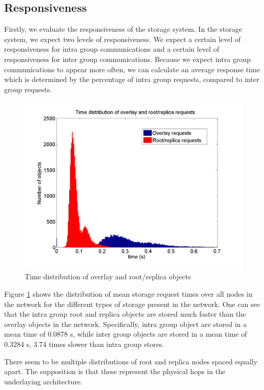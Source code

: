 \documentclass[10pt,a4paper,conference]{IEEEtran}
\begin{document}
\subsection{Responsiveness}

Firstly, we evaluate the responsiveness of the storage system. In the storage system, we expect two levels of responsiveness. We expect a certain
level of responsiveness for intra group communications and a certain level of responsiveness for inter group communications. Because we expect intra
group communications to appear more often, we can calculate an average response time which is determined by the percentage of intra group requests,
compared to inter group requests.

\begin{figure}[htbp]
 \centering
 \includegraphics[clip=true, viewport=1.5cm 1.3cm 25.5cm 19.7cm, width=\columnwidth]{request_time_distribution}
 \caption{Time distribution of overlay and root/replica objects}
 \label{fig_pithos_response}
\end{figure}
%
Figure \ref{fig_pithos_response} shows the distribution of mean storage request times over all nodes in the network for the different types of
storage present in the network. One can see that the intra group root and replica objects are stored much faster than the overlay objects in the
network. Specifically, intra group object are stored in a mean time of 0.0878 s, while inter group objects are stored in a mean time of 0.3284 s,
3.74 times slower than intra group stores.

There seem to be multiple distributions of root and replica nodes spaced equally apart. The supposition is that these represent the physical hops in
the underlaying architecture.
\end{document}
